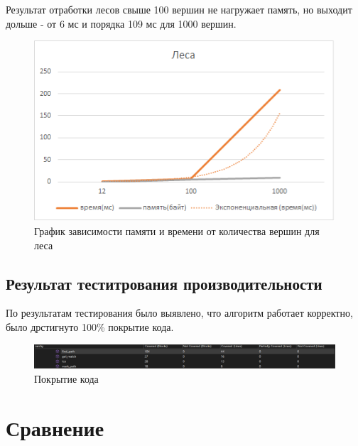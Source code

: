 \documentclass[14pt, a4paper]{extarticle}
\begin{document}
    Результат отработки лесов свыше 100 вершин не нагружает память, но выходит дольше - от 6 мс и порядка 109 мс для 1000 вершин.

    \begin{figure}[h!]
        \centering
        \includegraphics[scale=0.6]{forest.png}
        \caption{График зависимости памяти и времени от количества вершин для леса}
        \label{fig:my_label}
    \end{figure}    
    
    \pagebreak
    
    \subsection*{Результат теститрования производительности}

    По результатам тестирования было выявлено, что алгоритм работает корректно, было дрстигнуто 100\% покрытие кода.
    
    \begin{figure}[h!]
        \centering
        \includegraphics[scale=0.55]{coverage.png}
        \caption{Покрытие кода}
        \label{fig:my_label}
    \end{figure} 

    \section*{Сравнение}
\end{document}
